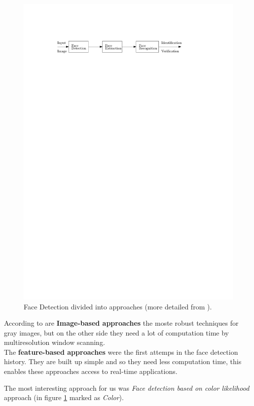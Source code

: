 \documentclass[Bachelorarbeit.tex]{subfiles}
\begin{document}
\begin{figure}[!h] %
\centering
\includegraphics[page=3, width=14cm]{./pictures/drawings_2}
\caption{Face Detection divided into approaches (more detailed from \cite{FDASurvey}). \label{FDaS}}
\end{figure}

According to \cite{FDASurvey} are \textbf{Image-based approaches} the moste robust techniques for gray images, but on the other side they need a lot of computation time by multiresolution window scanning.\\
The \textbf{feature-based approaches} were the first attemps in the face detection history. They are built up simple and so they need less computation time, this enables these approaches access to real-time applications.

The most interesting approach for us was \textit{Face detection based on color likelihood} approach (in figure \ref{FDaS} marked as \textit{Color}).
\end{document}
